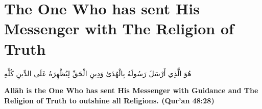 \chapter{The One Who has sent His Messenger with The Religion of Truth}
\begin{center}
    {\Huge    
        \begin{Arabic}
            هُوَ الَّذِي أَرْسَلَ رَسُولَهُ بِالْهُدَىٰ وَدِينِ الْحَقِّ لِيُظْهِرَهُ عَلَى الدِّينِ كُلِّهِ
        \end{Arabic}
    }
\end{center}
\vspace*{\fill}
\vspace{3cm}
\begin{center}
    \large \textbf{Allāh is the One Who has sent His Messenger with Guidance and The Religion of Truth to outshine all Religions. (Qur'an 48:28)}
\end{center}
